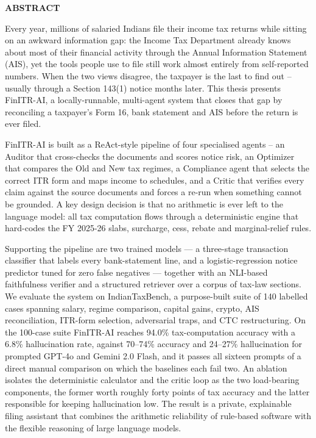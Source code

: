 \documentclass[12pt, a4paper, oneside]{report}
\newcommand{\frontmatterheading}[1]{%
  \begin{center}\Large\bfseries #1\end{center}
  \vspace{0.5cm}
}
\begin{document}
\clearpage
\thispagestyle{plain}
\frontmatterheading{ABSTRACT}


Every year, millions of salaried Indians file their income tax returns while
sitting on an awkward information gap: the Income Tax Department already knows
about most of their financial activity through the Annual Information Statement
(AIS), yet the tools people use to file still work almost entirely from
self-reported numbers. When the two views disagree, the taxpayer is the last to
find out -- usually through a Section 143(1) notice months later. This thesis
presents FinITR-AI, a locally-runnable, multi-agent system that closes that gap
by reconciling a taxpayer's Form 16, bank statement and AIS before the return is
ever filed.

FinITR-AI is built as a ReAct-style pipeline of four specialised agents -- an
Auditor that cross-checks the documents and scores notice risk, an Optimizer
that compares the Old and New tax regimes, a Compliance agent that selects the
correct ITR form and maps income to schedules, and a Critic that verifies every
claim against the source documents and forces a re-run when something cannot be
grounded. A key design decision is that no arithmetic is ever left to the
language model: all tax computation flows through a deterministic engine that
hard-codes the FY 2025-26 slabs, surcharge, cess, rebate and marginal-relief
rules.

Supporting the pipeline are two trained models --- a three-stage transaction
classifier that labels every bank-statement line, and a logistic-regression
notice predictor tuned for zero false negatives --- together with an NLI-based
faithfulness verifier and a structured retriever over a corpus of tax-law
sections. We evaluate the system on IndianTaxBench, a purpose-built suite of 140
labelled cases spanning salary, regime comparison, capital gains, crypto, AIS
reconciliation, ITR-form selection, adversarial traps, and CTC restructuring. On
the 100-case suite FinITR-AI reaches 94.0\% tax-computation accuracy with a 6.8\%
hallucination rate, against 70--74\% accuracy and 24--27\% hallucination for
prompted GPT-4o and Gemini 2.0 Flash, and it passes all sixteen prompts of a
direct manual comparison on which the baselines each fail two. An ablation
isolates the deterministic calculator and the critic loop as the two
load-bearing components, the former worth roughly forty points of tax accuracy
and the latter responsible for keeping hallucination low. The result is a
private, explainable filing assistant that combines the arithmetic reliability
of rule-based software with the flexible reasoning of large language models.
\end{document}
